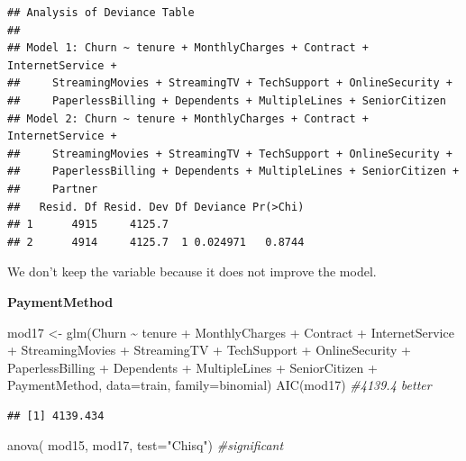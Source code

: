 \documentclass[
  twoside]{article}
\newenvironment{Shaded}{\begin{snugshade}}{\end{snugshade}}
\newcommand{\AttributeTok}[1]{\textcolor[rgb]{0.77,0.63,0.00}{#1}}
\newcommand{\CommentTok}[1]{\textcolor[rgb]{0.56,0.35,0.01}{\textit{#1}}}
\newcommand{\FunctionTok}[1]{\textcolor[rgb]{0.00,0.00,0.00}{#1}}
\newcommand{\NormalTok}[1]{#1}
\newcommand{\OtherTok}[1]{\textcolor[rgb]{0.56,0.35,0.01}{#1}}
\newcommand{\SpecialCharTok}[1]{\textcolor[rgb]{0.00,0.00,0.00}{#1}}
\newcommand{\StringTok}[1]{\textcolor[rgb]{0.31,0.60,0.02}{#1}}
\begin{document}
\begin{verbatim}
## Analysis of Deviance Table
## 
## Model 1: Churn ~ tenure + MonthlyCharges + Contract + InternetService + 
##     StreamingMovies + StreamingTV + TechSupport + OnlineSecurity + 
##     PaperlessBilling + Dependents + MultipleLines + SeniorCitizen
## Model 2: Churn ~ tenure + MonthlyCharges + Contract + InternetService + 
##     StreamingMovies + StreamingTV + TechSupport + OnlineSecurity + 
##     PaperlessBilling + Dependents + MultipleLines + SeniorCitizen + 
##     Partner
##   Resid. Df Resid. Dev Df Deviance Pr(>Chi)
## 1      4915     4125.7                     
## 2      4914     4125.7  1 0.024971   0.8744
\end{verbatim}

We don't keep the variable because it does not improve the model.

\textbf{PaymentMethod}

\begin{Shaded}
\begin{Highlighting}[]
\NormalTok{mod17 }\OtherTok{\textless{}{-}} \FunctionTok{glm}\NormalTok{(Churn }\SpecialCharTok{\textasciitilde{}}\NormalTok{ tenure }\SpecialCharTok{+}\NormalTok{ MonthlyCharges }\SpecialCharTok{+}\NormalTok{ Contract }\SpecialCharTok{+}\NormalTok{ InternetService }\SpecialCharTok{+} 
\NormalTok{               StreamingMovies }\SpecialCharTok{+}\NormalTok{ StreamingTV }\SpecialCharTok{+}\NormalTok{ TechSupport }\SpecialCharTok{+}\NormalTok{ OnlineSecurity }\SpecialCharTok{+} 
\NormalTok{               PaperlessBilling }\SpecialCharTok{+}\NormalTok{ Dependents }\SpecialCharTok{+}\NormalTok{ MultipleLines }\SpecialCharTok{+}\NormalTok{ SeniorCitizen }\SpecialCharTok{+} 
\NormalTok{               PaymentMethod, }\AttributeTok{data=}\NormalTok{train, }\AttributeTok{family=}\NormalTok{binomial) }
\FunctionTok{AIC}\NormalTok{(mod17) }\CommentTok{\#4139.4 better}
\end{Highlighting}
\end{Shaded}

\begin{verbatim}
## [1] 4139.434
\end{verbatim}

\begin{Shaded}
\begin{Highlighting}[]
\FunctionTok{anova}\NormalTok{( mod15, mod17,  }\AttributeTok{test=}\StringTok{"Chisq"}\NormalTok{) }\CommentTok{\#significant}
\end{Highlighting}
\end{Shaded}
\end{document}

